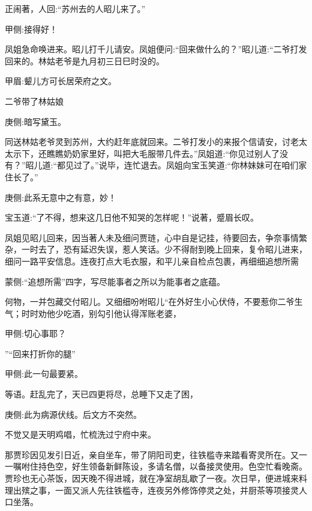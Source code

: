 \begin{parag}
    正闹著，人回:“苏州去的人昭儿来了。”\begin{note}甲侧:接得好！\end{note}凤姐急命唤进来。昭儿打千儿请安。凤姐便问:“回来做什么的？”昭儿道:“二爷打发回来的。林姑老爷是九月初三日巳时没的。\begin{note}甲眉:颦儿方可长居荣府之文。\end{note}二爷带了林姑娘\begin{note}庚侧:暗写黛玉。\end{note}同送林姑老爷灵到苏州，大约赶年底就回来。二爷打发小的来报个信请安，讨老太太示下，还瞧瞧奶奶家里好，叫把大毛服带几件去。”凤姐道:“你见过别人了没有？”昭儿道:“都见过了。”说毕，连忙退去。凤姐向宝玉笑道:“你林妹妹可在咱们家住长了。”\begin{note}庚侧:此系无意中之有意，妙！\end{note}宝玉道:“了不得，想来这几日他不知哭的怎样呢！”说著，蹙眉长叹。
\end{parag}


\begin{parag}
    凤姐见昭儿回来，因当著人未及细问贾琏，心中自是记挂，待要回去，争奈事情繁杂，一时去了，恐有延迟失误，惹人笑话。少不得耐到晚上回来，复令昭儿进来，细问一路平安信息。连夜打点大毛衣服，和平儿亲自检点包裹，再细细追想所需\begin{note}蒙侧:“追想所需”四字，写尽能事者之所以为能事者之底蕴。\end{note}何物，一并包藏交付昭儿。又细细吩咐昭儿“在外好生小心伏侍，不要惹你二爷生气；时时劝他少吃酒，别勾引他认得浑账老婆，\begin{note}甲侧:切心事耶？\end{note}”“回来打折你的腿”\begin{note}甲侧:此一句最要紧。\end{note}等语。赶乱完了，天已四更将尽，总睡下又走了困，\begin{note}庚侧:此为病源伏线。后文方不突然。\end{note}不觉又是天明鸡唱，忙梳洗过宁府中来。
\end{parag}


\begin{parag}
    那贾珍因见发引日近，亲自坐车，带了阴阳司吏，往铁槛寺来踏看寄灵所在。又一一嘱咐住持色空，好生领备新鲜陈设，多请名僧，以备接灵使用。色空忙看晚斋。贾珍也无心茶饭，因天晚不得进城，就在净室胡乱歇了一夜。次日早，便进城来料理出殡之事，一面又派人先往铁槛寺，连夜另外修饰停灵之处，并厨茶等项接灵人口坐落。
\end{parag}


